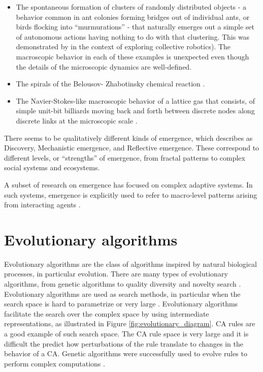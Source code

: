 \begin{itemize}
  \item The spontaneous formation of clusters of randomly distributed objects -
        a behavior common in ant colonies forming bridges out of individual
        ants, or birds flocking into ``murmurations'' - that naturally emerges
        out a simple set of autonomous actions having nothing to do with that
        clustering. This was demonstrated by
        \textcite{beckersFomLocalActions2000} in the context of exploring
        collective robotics). The macroscopic behavior in each of these examples
        is unexpected even though the details of the microscopic dynamics are
        well-defined.
  \item The spirals of the Belousov- Zhabotinsky chemical reaction
        \parencite{tysonBelousovZhabotinskiiReaction2013}.
  \item The Navier-Stokes-like macroscopic behavior of a lattice gas that
        consists, of simple unit-bit billiards moving back and forth between
        discrete nodes along discrete links at the microscopic scale
        \parencite{hasslacherDiscreteFluids1987}.
\end{itemize}

There seems to be qualitatively different kinds of emergence, which
\textcite{dehaanHowEmergenceArises2006} describes as Discovery, Mechanistic
emergence, and Reflective emergence. These correspond to different levels, or
``strengths'' of emergence, from fractal patterns to complex social systems and
ecosystems.

A subset of research on emergence has focused on complex adaptive systems. In
such systems, emergence is explicitly used to refer to macro-level patterns
arising from interacting agents \parencite{hollandEmergenceChaosOrder2000,
  kauffmanHomeUniverseSearch1995, langtonStudyingArtificialLife1986}.


\section{Evolutionary algorithms}\label{sec:evol-algor}
Evolutionary algorithms are the class of algorithms inspired by natural
biological processes, in particular evolution. There are many types of
evolutionary algorithms, from genetic algorithms to quality diversity and
novelty search \parencite{lehmanAbandoningObjectivesEvolution2011,
  lehmanEvolvingDiversityVirtual2011}. Evolutionary algorithms are used as
search methods, in particular when the search space is hard to parametrize or
very large \parencite{poliRelationsSearchEvolutionary1996}. Evolutionary
algorithms facilitate the search over the complex space by using intermediate
representations, as illustrated in Figure \ref{fig:evolutionary_diagram}.
\ac{CA} rules are a good example of such search space. The \ac{CA} rule space is
very large and it is difficult the predict how perturbations of the rule
translate to changes in the behavior of a \ac{CA}. Genetic algorithms were
successfully used to evolve rules to perform complex computations
\parencite{mitchellEvolvingCellularAutomata1996}.

